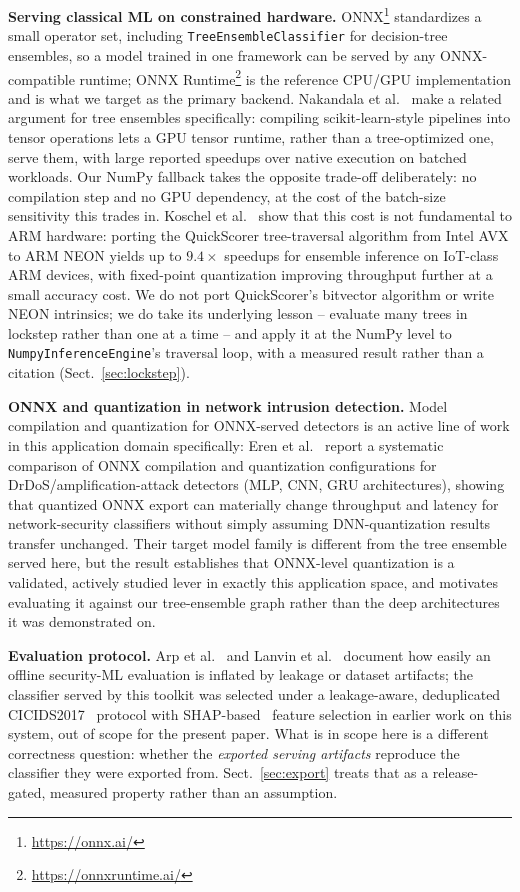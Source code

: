 \documentclass[runningheads]{llncs}
\begin{document}
\textbf{Serving classical ML on constrained hardware.} ONNX\footnote{\url{https://onnx.ai/}} standardizes a small operator set, including \texttt{TreeEnsembleClassifier} for decision-tree ensembles, so a model trained in one framework can be served by any ONNX-compatible runtime; ONNX Runtime\footnote{\url{https://onnxruntime.ai/}} is the reference CPU/GPU implementation and is what we target as the primary backend. Nakandala et al.~\cite{nakandala2020hummingbird} make a related argument for tree ensembles specifically: compiling scikit-learn-style pipelines into tensor operations lets a GPU tensor runtime, rather than a tree-optimized one, serve them, with large reported speedups over native execution on batched workloads. Our NumPy fallback takes the opposite trade-off deliberately: no compilation step and no GPU dependency, at the cost of the batch-size sensitivity this trades in. Koschel et al.~\cite{koschel2023arm} show that this cost is not fundamental to ARM hardware: porting the QuickScorer tree-traversal algorithm from Intel AVX to ARM NEON yields up to $9.4\times$ speedups for ensemble inference on IoT-class ARM devices, with fixed-point quantization improving throughput further at a small accuracy cost. We do not port QuickScorer's bitvector algorithm or write NEON intrinsics; we do take its underlying lesson -- evaluate many trees in lockstep rather than one at a time -- and apply it at the NumPy level to \texttt{NumpyInferenceEngine}'s traversal loop, with a measured result rather than a citation (Sect.~\ref{sec:lockstep}).

\textbf{ONNX and quantization in network intrusion detection.} Model compilation and quantization for ONNX-served detectors is an active line of work in this application domain specifically: Eren et al.~\cite{eren2026drdos} report a systematic comparison of ONNX compilation and quantization configurations for DrDoS/amplification-attack detectors (MLP, CNN, GRU architectures), showing that quantized ONNX export can materially change throughput and latency for network-security classifiers without simply assuming DNN-quantization results transfer unchanged. Their target model family is different from the tree ensemble served here, but the result establishes that ONNX-level quantization is a validated, actively studied lever in exactly this application space, and motivates evaluating it against our tree-ensemble graph rather than the deep architectures it was demonstrated on.

\textbf{Evaluation protocol.} Arp et al.~\cite{arp2022dosdonts} and Lanvin et al.~\cite{lanvin2023errors} document how easily an offline security-ML evaluation is inflated by leakage or dataset artifacts; the classifier served by this toolkit was selected under a leakage-aware, deduplicated CICIDS2017~\cite{sharafaldin2018toward} protocol with SHAP-based~\cite{lundberg2017unified} feature selection in earlier work on this system, out of scope for the present paper. What is in scope here is a different correctness question: whether the \emph{exported serving artifacts} reproduce the classifier they were exported from. Sect.~\ref{sec:export} treats that as a release-gated, measured property rather than an assumption.
\end{document}
